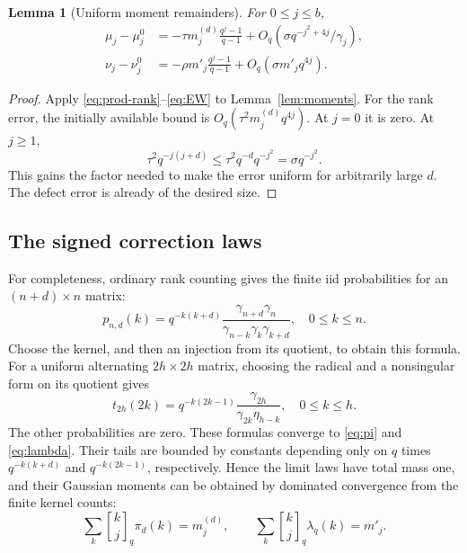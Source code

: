 \documentclass[11pt,letterpaper]{article}
\newtheorem{lemma}[theorem]{Lemma}
\theoremstyle{remark}
\newcommand{\qb}[2]{\genfrac{[}{]}{0pt}{}{#1}{#2}_{q}}
\begin{document}
\begin{lemma}[Uniform moment remainders]\label{lem:moment-errors}
For $0\le j\le b$,
\begin{align}
 \mu_j-\mu_j^0
   &=-\tau m_j^{(d)}\frac{q^j-1}{q-1}
       +O_q\left(\sigma q^{-j^2+4j}/\gamma_j\right),\label{eq:muerror}\\
 \nu_j-\nu_j^0
   &=-\rho m'_j\frac{q^j-1}{q-1}
       +O_q\left(\sigma m'_jq^{4j}\right).\label{eq:nuerror}
\end{align}
\end{lemma}

\begin{proof}
Apply \eqref{eq:prod-rank}--\eqref{eq:EW} to
Lemma~\ref{lem:moments}. For the rank error, the initially available
bound is $O_q(\tau^2m_j^{(d)}q^{4j})$. At $j=0$ it is zero.
At $j\ge1$,
\begin{equation}\label{eq:uniform-key}
 \tau^2q^{-j(j+d)}
       \le\tau^2q^{-d}q^{-j^2}
       =\sigma q^{-j^2}.
\end{equation}
This gains the factor needed to make the error uniform for arbitrarily
large $d$. The defect error is already of the desired size.
\end{proof}

\subsection{The signed correction laws}

For completeness, ordinary rank counting gives the finite iid probabilities
for an $(n+d)\times n$ matrix:
\begin{equation}\label{eq:finite-iid}
 p_{n,d}(k)=q^{-k(k+d)}
       \frac{\gamma_{n+d}\gamma_n}
            {\gamma_{n-k}\gamma_k\gamma_{k+d}},\quad 0\le k\le n.
\end{equation}
Choose the kernel, and then an injection from its quotient, to obtain this
formula. For a uniform alternating $2h\times2h$ matrix, choosing the radical
and a nonsingular form on its quotient gives
\begin{equation}\label{eq:finite-alt}
 t_{2h}(2k)=q^{-k(2k-1)}
        \frac{\gamma_{2h}}{\gamma_{2k}\eta_{h-k}},\quad 0\le k\le h.
\end{equation}
The other probabilities are zero.
These formulas converge to \eqref{eq:pi} and \eqref{eq:lambda}.
Their tails are bounded by constants depending only on $q$ times
$q^{-k(k+d)}$ and $q^{-k(2k-1)}$, respectively. Hence the limit laws have
total mass one, and their Gaussian moments can be obtained by dominated
convergence from the finite kernel counts:
\begin{equation}\label{eq:limit-moments}
 \sum_k\qb kj\pi_d(k)=m_j^{(d)},\qquad
 \sum_k\qb kj\lambda_q(k)=m'_j.
\end{equation}
\end{document}
